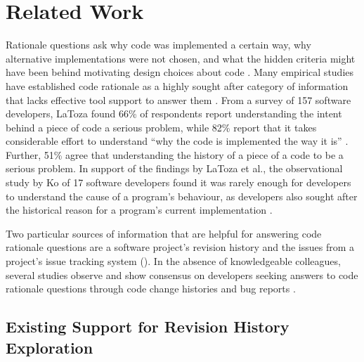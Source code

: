 \chapter{Related Work}
\label{ch:Related-Work}

Rationale questions ask why code was implemented a certain way, 
why alternative implementations were not chosen, and what the hidden criteria might have been 
behind motivating design choices about code \cite{latoza_hard-answer_2010}.
Many empirical studies have established code rationale as a highly sought after category of 
information that lacks effective tool support to answer them \cite{latoza_maintaining_2006, latoza_hard-answer_2010, ko_information_2007}. 
From a survey of 157 software developers, LaToza \etal found 66\% of respondents report understanding 
the intent behind a piece of code  a serious problem, 
while 82\% report that it takes considerable effort to understand ``why the code is implemented the way it is'' \cite{latoza_maintaining_2006}.
Further, 51\% agree that understanding the history of a piece of a code to be a serious problem.
In support of the findings by LaToza et al., the observational study by Ko \etal of 17 software 
developers found it was rarely enough for developers to understand the cause of a program's behaviour, 
as developers also sought after the historical reason for a program's current implementation \cite{ko_information_2007}.

Two particular sources of information that are helpful for answering code rationale questions 
are a software project's revision history and the issues from a project's issue tracking system (). 
In the absence of knowledgeable colleagues, several studies observe and show consensus 
on developers seeking answers to code rationale questions through code change histories 
and bug reports \cite{ko_information_2007, codoban_software_2015, robillard_turnover-induced_2021}.


\pagebreak
\section{Existing Support for Revision History Exploration}

